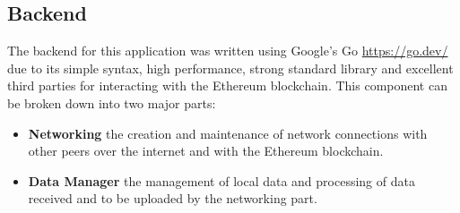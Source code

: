 \subsection{Backend}

The backend for this application was written using Google's Go \url{https://go.dev/} due to its simple syntax, high performance, strong standard library and excellent third parties for interacting with the Ethereum blockchain. This component can be broken down into two major parts:

\begin{itemize}
  \item \textbf{Networking} the creation and maintenance of network connections with other peers over the internet and with the Ethereum blockchain.
  \item \textbf{Data Manager} the management of local data and processing of data received and to be uploaded by the networking part.
\end{itemize}


